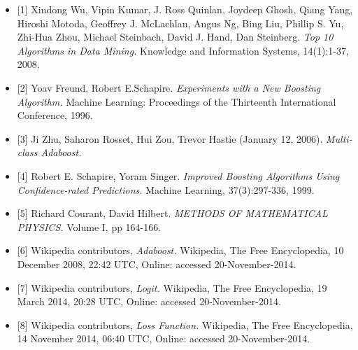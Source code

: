 \begin{itemize}
\item{[1]} Xindong Wu, Vipin Kumar, J. Ross Quinlan, Joydeep Ghosh, Qiang Yang, Hiroshi Motoda, Geoffrey J. McLachlan, Angus Ng, Bing Liu, Phillip S. Yu,
Zhi-Hua Zhou, Michael Steinbach, David J. Hand, Dan Steinberg. \textit{Top 10 Algorithms in Data Mining.} Knowledge and Information Systems, 14(1):1-37, 2008.\\
\item{[2]} Yoav Freund, Robert E.Schapire. \textit{Experiments with a New Boosting Algorithm.} Machine Learning: Proceedings of the Thirteenth International Conference, 1996.\\
\item{[3]} Ji Zhu, Saharon Rosset, Hui Zou, Trevor Hastie 
(January 12, 2006). \textit{Multi-class Adaboost.} \\
\item{[4]} Robert E. Schapire, Yoram Singer. \textit{Improved Boosting Algorithms Using Confidence-rated Predictions.} Machine Learning, 37(3):297-336, 1999.\\

\item{[5]} Richard Courant, David Hilbert. \textit{METHODS OF MATHEMATICAL PHYSICS.}
Volume I, pp 164-166. \\
\item{[6]} Wikipedia contributors, \textit{Adaboost.} Wikipedia, The Free Encyclopedia, 10 December 2008, 22:42 UTC, Online: accessed 20-November-2014.\\

\item{[7]} Wikipedia contributors, \textit{Logit.} Wikipedia, The Free Encyclopedia, 19 March 2014, 20:28 UTC, Online: accessed 20-November-2014.\\

\item{[8]} Wikipedia contributors, \textit{Loss Function.} Wikipedia, The Free Encyclopedia, 14 November 2014, 06:40 UTC, Online: accessed 20-November-2014.
\end{itemize}